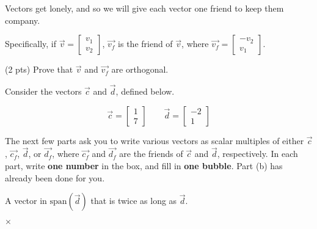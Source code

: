 \documentclass[twoside,12pt]{article}
\begin{document}
\begin{probset}

\begin{prob}[(14 pts)]

Vectors get lonely, and so we will give each vector one friend to keep them company.

Specifically, if $\vec{v} = \begin{bmatrix} v_1 \\ v_2 \end{bmatrix}$, $\vec{v_f}$ is the friend of $\vec{v}$, where $\vec{v_f} = \begin{bmatrix} -v_2 \\ v_1 \end{bmatrix}$.

\begin{subprobset}

\begin{subprob}(2 pts) Prove that $\vec{v}$ and $\vec{v_f}$ are orthogonal.

\begin{responsebox}{1in}
    
\end{responsebox}
    
\end{subprob}

\end{subprobset}

Consider the vectors $\vec{c}$ and $\vec{d}$, defined below.

$$\vec{c} = \begin{bmatrix} 1 \\ 7 \end{bmatrix} \qquad \vec{d} = \begin{bmatrix} -2 \\ 1 \end{bmatrix}$$

The next few parts ask you to write various vectors as scalar multiples of either $\vec{c}$, $\vec{c_f}$, $\vec{d}$, or $\vec{d_f}$, where $\vec{c_f}$ and $\vec{d_f}$ are the friends of $\vec{c}$ and $\vec{d}$, respectively. In each part, write \textbf{one number} in the box, and fill in \textbf{one bubble}. Part (b) has already been done for you.

\begin{subprobset}

\begin{subprob}A vector in $\text{span}(\vec{d})$ that is twice as long as $\vec{d}$.

 $\times$    


\end{subprob}
\end{subprobset}
\end{prob}
\end{probset}
\end{document}
